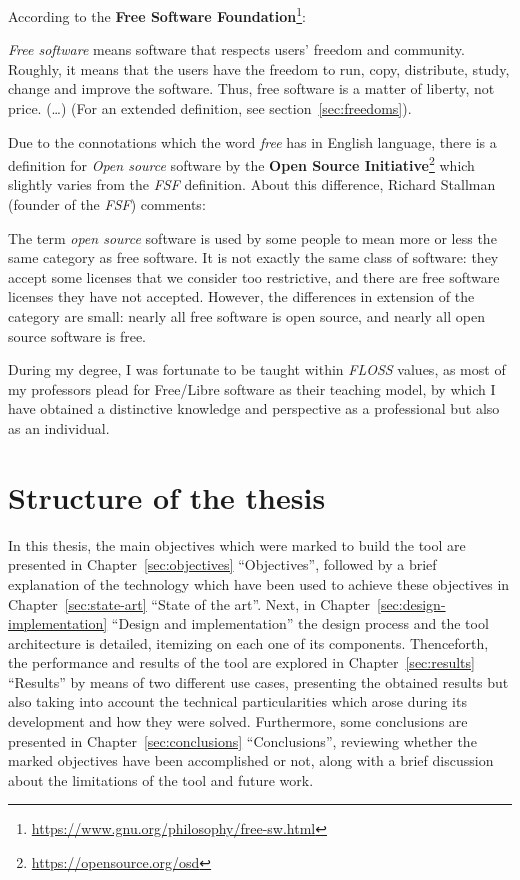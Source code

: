 \documentclass[a4paper, 12pt]{book}
\begin{document}
According to the \textbf{Free Software Foundation}\footnote{\url{https://www.gnu.org/philosophy/free-sw.html}}:
\begin{displayquote}
    \emph{Free software} means software that respects users' freedom and community. Roughly, it means that the users have the freedom
    to run, copy, distribute, study, change and improve the software. Thus, free software is a matter of liberty, not price. (\ldots)
    (For an extended definition, see section~\ref{sec:freedoms}).\\
\end{displayquote}

Due to the connotations which the word \emph{free} has in English language, there is a definition
for \emph{Open source} software by the \textbf{Open Source Initiative}\footnote{\url{https://opensource.org/osd}} which
slightly varies from the \emph{FSF} definition. About this difference, Richard Stallman (founder of the \emph{FSF}) comments:

\begin{displayquote}
The term \emph{open source} software is used by some people to mean more or less the same category as free software.
It is not exactly the same class of software: they accept some licenses that we consider too restrictive,
and there are free software licenses they have not accepted. However, the differences in extension of the
category are small: nearly all free software is open source, and nearly all open source software is free.
\end{displayquote}

During my degree, I was fortunate to be taught within \emph{FLOSS} values, as most of my professors plead
for Free/Libre software as their teaching model, by which I have obtained a distinctive knowledge and perspective
as a professional but also as an individual.

\section{Structure of the thesis}
\label{sec:structure}

In this thesis, the main objectives which were marked to build the tool are presented in Chapter~\ref{sec:objectives} ``Objectives'',
followed by a brief explanation of the technology which have been used to achieve these objectives in Chapter~\ref{sec:state-art} ``State of the art''.
Next, in Chapter~\ref{sec:design-implementation} ``Design and implementation'' the design process and the tool architecture is detailed, itemizing on each one of its components.
Thenceforth, the performance and results of the tool are explored in Chapter~\ref{sec:results} ``Results'' by means of two different use cases,
presenting the obtained results but also taking into account the technical particularities which arose during its development and how they were solved.
Furthermore, some conclusions are presented in Chapter~\ref{sec:conclusions} ``Conclusions'', reviewing whether the marked objectives have been accomplished or not,
along with a brief discussion about the limitations of the tool and future work.
\end{document}
